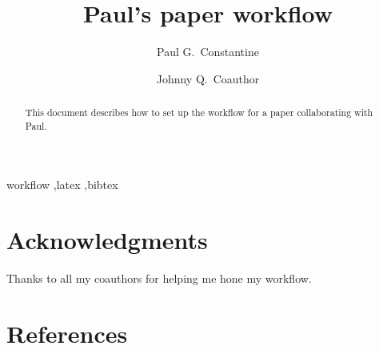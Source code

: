 \documentclass[review]{elsarticle}
\begin{document}
\begin{frontmatter}

\title{Paul's paper workflow}





\author[CSM]{Paul G.~Constantine}
\address[CSM]{Department of Applied Mathematics and Statistics, Colorado School of Mines, Golden, CO 80211} 

\author[UT]{Johnny Q.~Coauthor}
\address[UT]{Department of Stuff, University of Somewhere, Somewhere, TX 99999}

\begin{abstract}
This document describes how to set up the workflow for a paper collaborating with Paul.
\end{abstract}

\begin{keyword}
workflow \sep latex \sep bibtex
\end{keyword}

\end{frontmatter}

\linenumbers






\section*{Acknowledgments}

\noindent Thanks to all my coauthors for helping me hone my workflow.

\section*{References}


\end{document}
